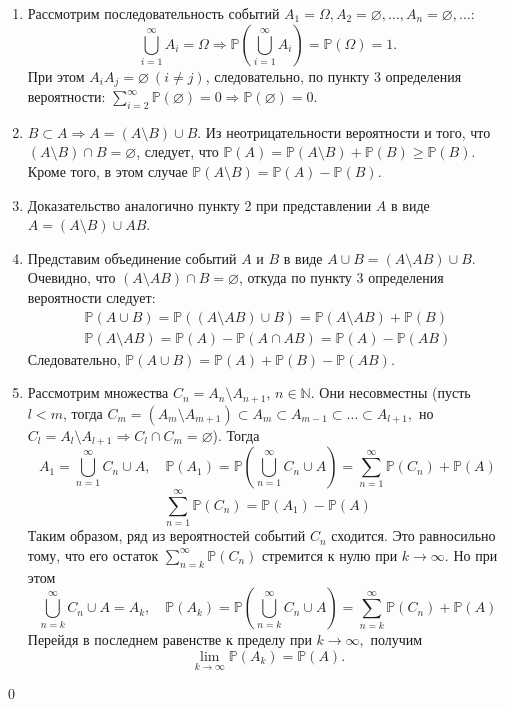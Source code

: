 \documentclass[oneside,final,14pt]{extreport}
\newcommand\myprob[1]{{\mathbb{P}(#1)}}
\renewenvironment{proof}{{\bfseries Доказательство.}}{\qed}
\theoremstyle{plain}
\theoremstyle{definition}
\theoremstyle{named}
\begin{document}
\begin{proof}\leavevmode
    \begin{enumerate}
    \item Рассмотрим последовательность событий $A_{1} = \Omega, A_{2} = \varnothing, \ldots, A_{n} = \varnothing, \ldots$:
    \begin{equation*}
        \bigcup\limits_{i=1}^\infty A_i = \Omega \Rightarrow \myprob{\bigcup\limits_{i=1}^\infty A_i} = \myprob{\Omega} = 1.
    \end{equation*}
    При этом $A_{i}A_j = \varnothing~(i \ne j)$, следовательно, по пункту 3 определения вероятности: $\sum\limits_{i=2}^\infty \myprob{\varnothing} = 0 \Rightarrow \myprob{\varnothing} = 0$.
    \item $B \subset A \Rightarrow A = (A \setminus B) \cup B$. Из неотрицательности вероятности и того, что $(A \setminus B) \cap B = \varnothing$, следует, что $\myprob{A} = \myprob{A \setminus B} + \myprob{B} \geqslant \myprob{B}$. Кроме того, в этом случае $\myprob{A \setminus B} = \myprob{A} - \myprob{B}$.
    \item Доказательство аналогично пункту 2 при представлении $A$ в виде $A = (A \setminus B) \cup AB$.
    \item Представим объединение событий $A$ и $B$ в виде $A \cup B = (A \setminus AB) \cup B$. Очевидно, что $(A \setminus AB) \cap B = \varnothing$, откуда по пункту 3 определения вероятности следует:
    \begin{gather*}
        \myprob{A \cup B} = \myprob{(A \setminus AB) \cup B} = \myprob{A \setminus AB} + \myprob{B} \\
        \myprob{A \setminus AB} = \myprob{A} - \myprob{A \cap AB} = \myprob{A} - \myprob{AB}
    \end{gather*}
    Следовательно, $\myprob{A \cup B} = \myprob{A} + \myprob{B} - \myprob{AB}$.
    \item Рассмотрим множества $C_n = A_n \setminus A_{n+1}, \, n \in \mathbb{N}$. Они несовместны (пусть $l < m$, тогда $C_m = (A_m \setminus A_{m+1}) \subset A_m \subset A_{m-1} \subset \ldots \subset A_{l+1},$ но $C_l = A_l \setminus A_{l+1} \Rightarrow C_l \cap C_m = \varnothing$). Тогда
    $$A_1 = \bigcup\limits_{n = 1}^{\infty} C_n \cup A, \quad \myprob{A_1} = \mathbb{P}\left({\bigcup\limits_{n = 1}^{\infty} C_n \cup A}\right) = \sum\limits_{n=1}^{\infty} \myprob{C_n} + \myprob{A} $$
    $$ \sum\limits_{n=1}^{\infty} \myprob{C_n} = \myprob{A_1} - \myprob{A}$$
    Таким образом, ряд из вероятностей событий $C_n$ сходится. Это равносильно тому, что его остаток $\sum\limits_{n=k}^{\infty} \myprob{C_n}$ стремится к нулю при $k \rightarrow \infty$. Но при этом
    $$ \bigcup\limits_{n = k}^{\infty} C_n \cup A = A_k, \quad \myprob{A_k} = \mathbb{P}\left({\bigcup\limits_{n = k}^{\infty} C_n \cup A}\right) = \sum\limits_{n=k}^{\infty} \myprob{C_n} + \myprob{A} $$
    Перейдя в последнем равенстве к пределу при $k \rightarrow \infty,$ получим
    $$ \lim_{k \to \infty} \myprob{A_k} = \myprob{A}.$$

\end{enumerate}
\end{proof}
\end{document}
